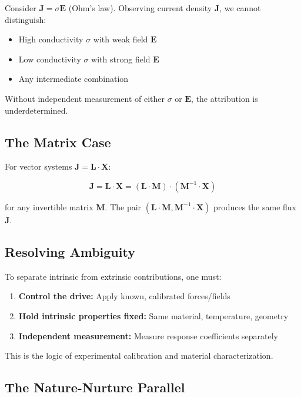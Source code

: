 \documentclass[
]{article}
\providecommand{\tightlist}{%
  \setlength{\itemsep}{0pt}\setlength{\parskip}{0pt}}
\begin{document}
Consider \(\mathbf{J} = \sigma \mathbf{E}\) (Ohm's law). Observing
current density \(\mathbf{J}\), we cannot distinguish:

\begin{itemize}
\tightlist
\item
  High conductivity \(\sigma\) with weak field \(\mathbf{E}\)
\item
  Low conductivity \(\sigma\) with strong field \(\mathbf{E}\)
\item
  Any intermediate combination
\end{itemize}

Without independent measurement of either \(\sigma\) or \(\mathbf{E}\),
the attribution is underdetermined.

\subsection{The Matrix Case}\label{the-matrix-case}

For vector systems \(\mathbf{J} = \mathbf{L} \cdot \mathbf{X}\):

\[\mathbf{J} = \mathbf{L} \cdot \mathbf{X} = (\mathbf{L} \cdot \mathbf{M}) \cdot (\mathbf{M}^{-1} \cdot \mathbf{X})\]

for any invertible matrix \(\mathbf{M}\). The pair
\((\mathbf{L} \cdot \mathbf{M}, \mathbf{M}^{-1} \cdot \mathbf{X})\)
produces the same flux \(\mathbf{J}\).

\subsection{Resolving Ambiguity}\label{resolving-ambiguity}

To separate intrinsic from extrinsic contributions, one must:

\begin{enumerate}
\def\labelenumi{\arabic{enumi}.}
\tightlist
\item
  \textbf{Control the drive:} Apply known, calibrated forces/fields
\item
  \textbf{Hold intrinsic properties fixed:} Same material, temperature,
  geometry
\item
  \textbf{Independent measurement:} Measure response coefficients
  separately
\end{enumerate}

This is the logic of experimental calibration and material
characterization.

\subsection{The Nature-Nurture
Parallel}\label{the-nature-nurture-parallel}
\end{document}
